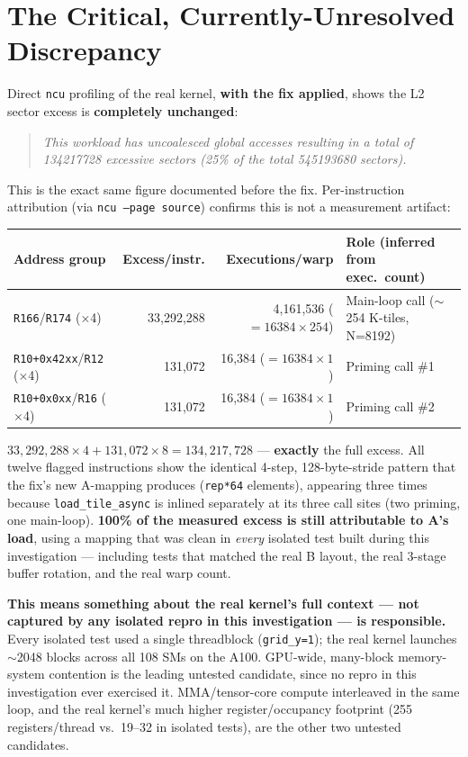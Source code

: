 \documentclass[11pt]{article}
\begin{document}
\section{The Critical, Currently-Unresolved Discrepancy}

Direct \texttt{ncu} profiling of the real kernel, \textbf{with the fix applied}, shows the L2 sector excess is \textbf{completely unchanged}:

\begin{quote}
\textit{This workload has uncoalesced global accesses resulting in a total of 134217728 excessive sectors (25\% of the total 545193680 sectors).}
\end{quote}

This is the exact same figure documented before the fix. Per-instruction attribution (via \texttt{ncu --page source}) confirms this is not a measurement artifact:

\begin{table}[h]
\centering
\begin{tabular}{lrrl}
\toprule
Address group & Excess/instr. & Executions/warp & Role (inferred from exec.\ count) \\
\midrule
\texttt{R166}/\texttt{R174} ($\times$4) & 33{,}292{,}288 & 4{,}161{,}536 ($=16384\times254$) & Main-loop call ($\sim$254 K-tiles, N=8192) \\
\texttt{R10+0x42xx}/\texttt{R12} ($\times$4) & 131{,}072 & 16{,}384 ($=16384\times1$) & Priming call \#1 \\
\texttt{R10+0x0xx}/\texttt{R16} ($\times$4) & 131{,}072 & 16{,}384 ($=16384\times1$) & Priming call \#2 \\
\bottomrule
\end{tabular}
\end{table}

$33{,}292{,}288\times4 + 131{,}072\times8 = 134{,}217{,}728$ --- \textbf{exactly} the full excess. All twelve flagged instructions show the identical 4-step, 128-byte-stride pattern that the fix's new A-mapping produces (\texttt{rep*64} elements), appearing three times because \texttt{load\_tile\_async} is inlined separately at its three call sites (two priming, one main-loop). \textbf{100\% of the measured excess is still attributable to A's load}, using a mapping that was clean in \emph{every} isolated test built during this investigation --- including tests that matched the real B layout, the real 3-stage buffer rotation, and the real warp count.

\textbf{This means something about the real kernel's full context --- not captured by any isolated repro in this investigation --- is responsible.} Every isolated test used a single threadblock (\texttt{grid\_y=1}); the real kernel launches $\sim$2048 blocks across all 108 SMs on the A100. GPU-wide, many-block memory-system contention is the leading untested candidate, since no repro in this investigation ever exercised it. MMA/tensor-core compute interleaved in the same loop, and the real kernel's much higher register/occupancy footprint (255 registers/thread vs.\ 19--32 in isolated tests), are the other two untested candidates.
\end{document}
